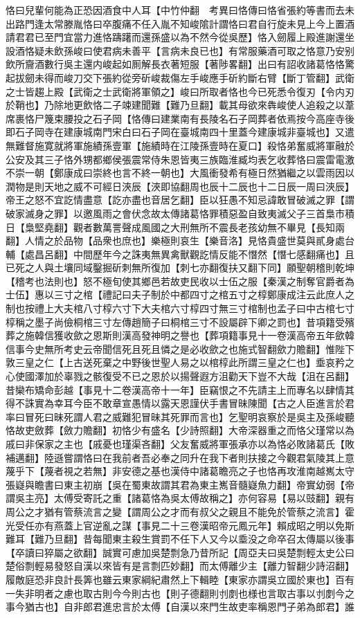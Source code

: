 恪曰兒輩何能為正恐因酒食中人耳【中竹仲翻　考異曰恪傳曰恪省張約等書而去未出路門逢太常滕胤恪曰卒腹痛不任入胤不知峻隂計謂恪曰君自行旋未見上今上置酒請君君已至門宜當力進恪躊躇而還孫盛以為不然今從吳歷】恪入劒履上殿進謝還坐設酒恪疑未飲孫峻曰使君病未善平【言病未良已也】有常服藥酒可取之恪意乃安别飲所齎酒數行吳主還内峻起如厠解長衣著短服【著陟畧翻】出曰有詔收諸葛恪恪驚起拔劒未得而峻刀交下張約從旁斫峻裁傷左手峻應手斫約斷右臂【斷丁管翻】武衛之士皆趨上殿【武衛之士武衛將軍領之】峻曰所取者恪也今已死悉令復刃【令内刃於鞘也】乃除地更飲恪二子竦建聞難【難乃旦翻】載其母欲來犇峻使人追殺之以葦席裹恪尸篾束腰投之石子岡【恪傳曰建業南有長陵名石子岡葬者依焉按今高座寺後即石子岡寺在建康城南門宋白曰石子岡在臺城南四十里蓋今建康城非臺城也】又遣無難督施寛就將軍施績孫壹軍【施績時在江陵孫壹時在夏口】殺恪弟奮威將軍融於公安及其三子恪外甥都鄉侯張震常侍朱恩皆夷三族臨淮臧均表乞收葬恪曰震雷電激不崇一朝【鄭康成曰崇終也言不終一朝也】大風衝發希有極日然猶繼之以雲雨因以潤物是則天地之威不可經日浹辰【浹即協翻周也辰十二辰也十二日辰一周曰浹辰】帝王之怒不宜訖情盡意【訖亦盡也音居乞翻】臣以狂愚不知忌諱敢冒破滅之罪【謂破家滅身之罪】以邀風雨之會伏念故太傳諸葛恪罪積惡盈自致夷滅父子三首梟市積日【梟堅堯翻】觀者數萬詈聲成風國之大刑無所不震長老孩幼無不畢見【長知兩翻】人情之於品物【品衆也庶也】樂極則哀生【樂音洛】見恪貴盛世莫與貳身處台輔【處昌呂翻】中間歷年今之誅夷無異禽獸觀訖情反能不憯然【憯七感翻痛也】且已死之人與土壤同域鑿掘斫刺無所復加【刺七亦翻復扶又翻下同】願聖朝稽則乾坤【稽考也法則也】怒不極旬使其鄉邑若故吏民收以士伍之服【秦漢之制奪官爵者為士伍】惠以三寸之棺【禮記曰夫子制於中都四寸之棺五寸之椁鄭康成注云此庶人之制也按禮上大夫棺八寸椁六寸下大夫棺六寸椁四寸無三寸棺制也孟子曰中古棺七寸椁稱之墨子尚儉桐棺三寸左傳趙簡子曰桐棺三寸不設屬辟下卿之罰也】昔項籍受殯葬之施韓信獲收歛之恩斯則漢高發神明之譽也【葬項籍事見十一卷漢高帝五年歛韓信事今史無所考史云帝聞信死且死且憐之是必收歛之也施式智翻歛力贍翻】惟陛下敦三皇之仁【上古送死棄之中野後世聖人易之以棺椁此所謂三皇之仁也】埀哀矜之心使國澤加於辜戮之骸復受不已之恩於以揚聲遐方沮勸天下豈不大哉【沮在呂翻】昔欒布矯命彭越【事見十二卷漢高帝十一年】臣竊恨之不先請主上而專名以肆情其得不誅實為幸耳今臣不敢章宣愚情以露天恩謹伏手書冒昧陳聞【古之人臣進言於君率曰冒死曰昧死謂人君之威難犯冒昧其死罪而言也】乞聖明哀察於是吳主及孫峻聽恪故吏斂葬【斂力贍翻】初恪少有盛名【少詩照翻】大帝深器重之而恪父瑾常以為戚曰非保家之主也【戚憂也瑾渠吝翻】父友奮威將軍張承亦以為恪必敗諸葛氏【敗補邁翻】陸遜嘗謂恪曰在我前者吾必奉之同升在我下者則扶接之今觀君氣陵其上意蔑乎下【蔑者視之若無】非安德之基也漢侍中諸葛瞻亮之子也恪再攻淮南越嶲太守張嶷與瞻書曰東主初崩【吳在蜀東故謂其君為東主嶲音髓嶷魚力翻】帝實幼弱【帝謂吳主亮】太傅受寄託之重【諸葛恪為吳太傅故稱之】亦何容易【易以豉翻】親有周公之才猶有管蔡流言之變【謂周公之才而有叔父之親且不能免於管蔡之流言】霍光受任亦有燕蓋上官逆亂之謀【事見二十三卷漢昭帝元鳳元年】賴成昭之明以免斯難耳【難乃旦翻】昔每聞東主殺生賞罰不任下人又今以埀没之命卒召太傳屬以後事【卒讀曰猝屬之欲翻】誠實可慮加吳楚剽急乃昔所記【周亞夫曰吳楚剽輕太史公曰楚俗剽輕易發怒自漢以來皆有是言剽匹妙翻】而太傅離少主【離力智翻少詩沼翻】履敵庭恐非良計長筭也雖云東家綱紀肅然上下輯睦【東家亦謂吳立國於東也】百有一失非明者之慮也取古則今今則古也【則子德翻則刌剫也様也言取古事以刌剫今之事今猶古也】自非郎君進忠言於太傅【自漢以來門生故吏率稱恩門子弟為郎君】誰